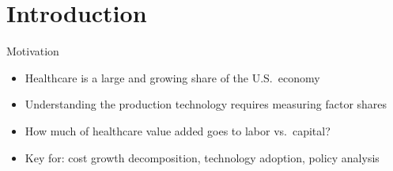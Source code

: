 
\section{Introduction}

\begin{frame}{Motivation}

\begin{itemize}
    \item Healthcare is a large and growing share of the U.S.\ economy
    \item Understanding the production technology requires measuring factor shares
    \item How much of healthcare value added goes to labor vs.\ capital?
    \item Key for: cost growth decomposition, technology adoption, policy analysis
\end{itemize}

\end{frame}

